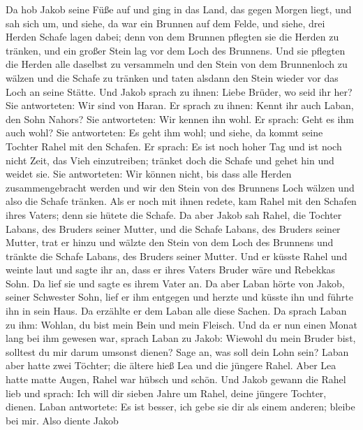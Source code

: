  Da hob Jakob seine Füße auf und ging in das Land, das
gegen Morgen liegt,  und sah sich um, und siehe, da war
ein Brunnen auf dem Felde, und siehe, drei Herden Schafe lagen dabei;
denn von dem Brunnen pflegten sie die Herden zu tränken, und ein großer
Stein lag vor dem Loch des Brunnens.  Und sie pflegten die
Herden alle daselbst zu versammeln und den Stein von dem Brunnenloch zu
wälzen und die Schafe zu tränken und taten alsdann den Stein wieder vor
das Loch an seine Stätte.  Und Jakob sprach zu ihnen:
Liebe Brüder, wo seid ihr her? Sie antworteten: Wir sind von Haran.
 Er sprach zu ihnen: Kennt ihr auch Laban, den Sohn
Nahors? Sie antworteten: Wir kennen ihn wohl.  Er sprach:
Geht es ihm auch wohl? Sie antworteten: Es geht ihm wohl; und siehe, da
kommt seine Tochter Rahel mit den Schafen.  Er sprach: Es
ist noch hoher Tag und ist noch nicht Zeit, das Vieh einzutreiben;
tränket doch die Schafe und gehet hin und weidet sie.  Sie
antworteten: Wir können nicht, bis dass alle Herden zusammengebracht
werden und wir den Stein von des Brunnens Loch wälzen und also die
Schafe tränken.  Als er noch mit ihnen redete, kam Rahel
mit den Schafen ihres Vaters; denn sie hütete die Schafe.
 Da aber Jakob sah Rahel, die Tochter Labans, des Bruders
seiner Mutter, und die Schafe Labans, des Bruders seiner Mutter, trat er
hinzu und wälzte den Stein von dem Loch des Brunnens und tränkte die
Schafe Labans, des Bruders seiner Mutter.  Und er küsste
Rahel und weinte laut  und sagte ihr an, dass er ihres
Vaters Bruder wäre und Rebekkas Sohn. Da lief sie und sagte es ihrem
Vater an.  Da aber Laban hörte von Jakob, seiner
Schwester Sohn, lief er ihm entgegen und herzte und küsste ihn und
führte ihn in sein Haus. Da erzählte er dem Laban alle diese Sachen.
 Da sprach Laban zu ihm: Wohlan, du bist mein Bein und
mein Fleisch. Und da er nun einen Monat lang bei ihm gewesen war,
 sprach Laban zu Jakob: Wiewohl du mein Bruder bist,
solltest du mir darum umsonst dienen? Sage an, was soll dein Lohn sein?
 Laban aber hatte zwei Töchter; die ältere hieß Lea und
die jüngere Rahel.  Aber Lea hatte matte Augen, Rahel war
hübsch und schön.  Und Jakob gewann die Rahel lieb und
sprach: Ich will dir sieben Jahre um Rahel, deine jüngere Tochter,
dienen.  Laban antwortete: Es ist besser, ich gebe sie
dir als einem anderen; bleibe bei mir.  Also diente Jakob
